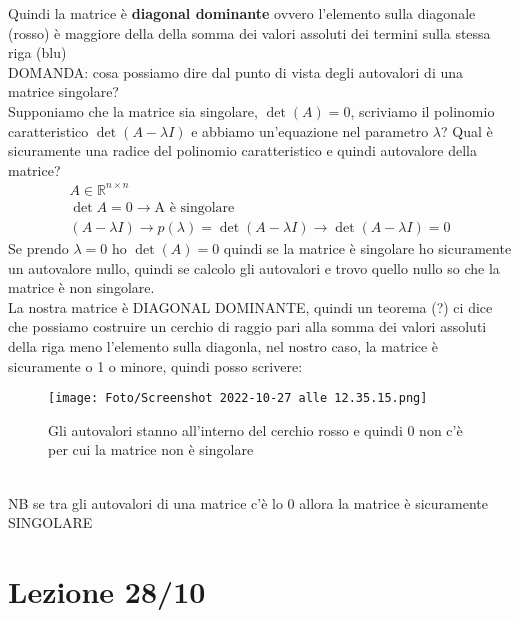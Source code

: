 \documentclass[a4paper, portrait]{book}
\numberwithin{equation}{chapter} %
\begin{document}
Quindi la matrice è \textbf{diagonal dominante} ovvero l'elemento sulla diagonale (rosso) è maggiore della della somma dei valori assoluti dei termini sulla stessa riga (blu)\\
DOMANDA: cosa possiamo dire dal punto di vista degli autovalori di una matrice singolare?\\
Supponiamo che la matrice sia singolare, $\det(A) = 0$, scriviamo il polinomio caratteristico $\det(A-\lambda I)$ e abbiamo un'equazione nel parametro $\lambda$? Qual è sicuramente una radice del polinomio caratteristico e quindi autovalore della matrice?
\begin{gather}
    A \in \mathbb{R}^{n\times n}\\
    \det A = 0 \rightarrow \text{A è singolare}\\
    (A - \lambda I) \rightarrow p(\lambda) = \det(A-\lambda I) \rightarrow \det(A-\lambda I) = 0
\end{gather}
Se prendo $\lambda = 0$ ho $\det(A) = 0$ quindi se la matrice è singolare ho sicuramente un autovalore nullo, quindi se calcolo gli autovalori e trovo quello nullo so che la matrice è non singolare.\\
La nostra matrice è DIAGONAL DOMINANTE, quindi un teorema (?) ci dice che possiamo costruire un cerchio di raggio pari alla somma dei valori assoluti della riga meno l'elemento sulla diagonla, nel nostro caso, la matrice è sicuramente o 1 o minore, quindi posso scrivere:
\begin{figure}
    \centering
    \texttt{[image: Foto/Screenshot 2022-10-27 alle 12.35.15.png]}
    \caption{Gli autovalori stanno all'interno del cerchio rosso e quindi 0 non c'è per cui la matrice non è singolare}
\end{figure}
\\NB se tra gli autovalori di una matrice c'è lo 0 allora la matrice è sicuramente SINGOLARE
\chapter{Lezione 28/10}
\end{document}
